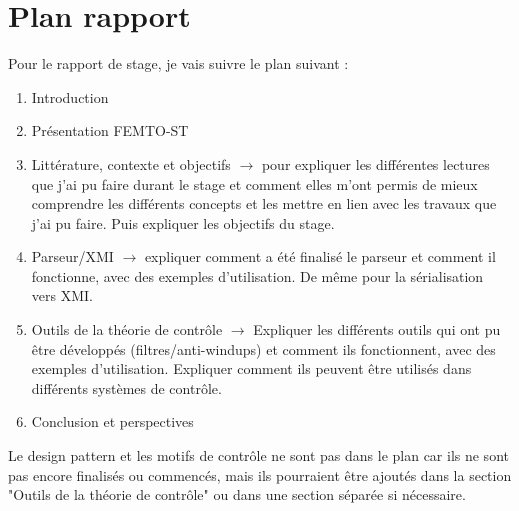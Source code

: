 \documentclass{article}
\begin{document}
\section{Plan rapport}

Pour le rapport de stage, je vais suivre le plan suivant :

\begin{enumerate}
    \item Introduction
    \item Présentation FEMTO-ST
    \item Littérature, contexte et objectifs $\rightarrow$ pour expliquer les différentes lectures que j'ai pu faire
    durant le stage et comment elles m'ont permis de mieux comprendre les différents concepts et les mettre en lien 
    avec les travaux que j'ai pu faire. Puis expliquer les objectifs du stage.
    \item Parseur/XMI $\rightarrow$ expliquer comment a été finalisé le parseur et comment il fonctionne, avec des exemples d'utilisation. De même pour la sérialisation vers XMI.
    \item Outils de la théorie de contrôle $\rightarrow$ Expliquer les différents outils qui ont pu être développés (filtres/anti-windups) et comment ils fonctionnent, avec des exemples d'utilisation. Expliquer comment ils peuvent être utilisés dans différents systèmes de contrôle.
    \item Conclusion et perspectives
\end{enumerate}

Le design pattern et les motifs de contrôle ne sont pas dans le plan car ils ne sont pas encore finalisés ou commencés, mais ils pourraient être ajoutés dans la section "Outils de la théorie de contrôle" ou dans une section séparée si nécessaire.
\end{document}
